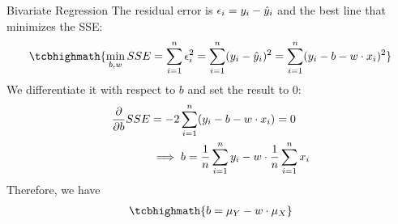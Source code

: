 %
\begin{frame}{Bivariate Regression}
The residual error is 
$    \epsilon_i = y_i - \hat{y}_i$
and the best line that minimizes the SSE:
\begin{align*}
    \tcbhighmath{
    \min_{b, w} SSE  = \sum_{i=1}^n \epsilon_i^2
     = \sum_{i=1}^n (y_i - \hy_i)^2
 =  \sum_{i=1}^n (y_i - b - w \cdot x_i)^2}
\end{align*}
%
We differentiate it with
respect to $b$ and set the result to $0$:
\begin{align*}
    \frac{\partial}{\partial b} SSE & = -2 \sum_{i=1}^n (y_i - b - w\cdot
    x_i) = 0 \notag\\
        & \implies b = \frac{1}{n} \sum_{i=1}^n y_i - w \cdot \frac{1}{n}
        \sum_{i=1}^n x_i \notag
\end{align*}
Therefore, we have
\begin{align*}
    \tcbhighmath{
    b = \mu_Y - w \cdot \mu_X}
\end{align*}
\end{frame}

